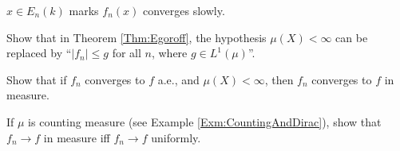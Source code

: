 \begin{rem}
    $x\in E_{n}(k)$ marks $f_{n}(x)$ converges slowly.
\end{rem}
\begin{exc}
    Show that in Theorem \ref{Thm:Egoroff}, the hypothesis 
    $\mu(X)<\infty$ can be replaced by ``$|f_{n}|\le g$ for all 
    $n$, where $g\in L^{1}(\mu)$''.
\end{exc}
\begin{exc}
    Show that if $f_{n}$ converges to $f$ a.e., and $\mu(X)<\infty$, 
    then $f_{n}$ converges to $f$ in measure.
\end{exc}
\begin{exc}
    If $\mu$ is counting measure 
    (see Example \ref{Exm:CountingAndDirac}), show that 
    $f_{n}\rightarrow f$ in measure iff $f_{n}\rightarrow f$ uniformly.
\end{exc}
